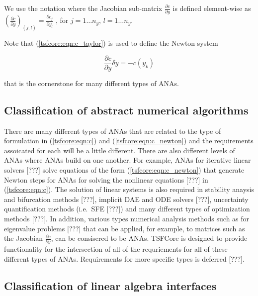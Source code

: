 \documentclass[10pt,fleqn]{article}
\begin{document}
We use the notation where the Jacobian sub-matrix $\frac{\partial
c}{\partial y}$ is defined element-wise as $\left( \frac{\partial
c}{\partial y} \right)_{(j,l)} = \frac{\partial c_j}{\partial y_l}$ ,
for $j = 1 \ldots n_y$, $l = 1 \ldots n_y$.

Note that (\ref{tsfcore:eqn:c_taylor}) is used to define the 
Newton system

\begin{equation}
\frac{\partial c}{\partial y} \delta y = - c(y_k)
\label{tsfcore:eqn:c_newton}
\end{equation}

that is the cornerstone for many different types of ANAs.

%
\subsection{Classification of abstract numerical algorithms}
\label{tsfcore:sec:classification_of_ANAs}
%

There are many different types of ANAs that are related to the type of
formulation in (\ref{tsfcore:eqn:c}) and (\ref{tsfcore:eqn:c_newton})
and the requirements assoicated for each will be a little different.
There are also different levels of ANAs where ANAs build on one
another.  For example, ANAs for iterative linear solvers [???] solve
equations of the form (\ref{tsfcore:eqn:c_newton}) that generate
Newton steps for ANAs for solving the nonlinear equations [???] in
(\ref{tsfcore:eqn:c}).  The solution of linear systems is also
required in stability anaysis and bifurcation methods [???], implicit
DAE and ODE solvers [???], uncertainty quantification methods
(i.e.~SFE [???]) and many different types of optimization methods
[???].  In addition, various types numerical analysis methods such as
for eigenvalue problems [???] that can be applied, for example, to
matrices such as the Jacobian $\frac{\partial c}{\partial y}$, can be
consisered to be ANAs.  TSFCore is designed to provide functionality
for the intersection of all of the requriements for all of these
different types of ANAs.  Requirements for more specific types is
deferred [???].

%
\subsection{Classification of linear algebra interfaces}
\label{tsfcore:sec:classification_of_lin_alg_itfc}
%
\end{document}
